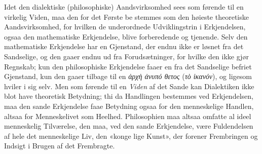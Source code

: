 \documentclass[12pt,a4paper]{book}
\newcommand{\gk}[1]{\textit{#1}}
\begin{document}
Idet den dialektiske (philosophiske) Aandsvirksomhed sees
som førende til en virkelig Viden, maa den for det Første be\-%
stemmes som den høieste theoretiske Aandsvirksomhed, for
hvilken de underordnede Udviklingstrin i Erkjendelsen, ogsaa
den mathematiske Erkjendelse, blive forberedende og tjenende.
Selv den mathematiske Erkjendelse har en Gjenstand, der
endnu ikke er løsnet fra det Sandselige, og den gaaer endnu
ud fra Forudsætninger, for hvilke den ikke gjør Regnskab;
kun den philosophiske Erkjendelse faaer en fra det Sandselige
befriet Gjenstand, kun den gaaer tilbage til en \gk{ἀρχὴ ἀνυπό\-%
θετος} (\gk{τὸ ἱκανόν}), og ligesom hviler i sig selv. Men som
førende til en \emph{Viden} af det Sande kan Dialektiken ikke blot
have theoretisk Betydning; thi da Handlingen bestemmes
ved Erkjendelsen, maa den sande Erkjendelse faae Betydning
ogsaa for den menneskelige Handlen, altsaa for Menneskelivet
som Heelhed. Philosophien maa altsaa omfatte al ideel
menneskelig Tilværelse, den maa, ved den sande Erkjendelse,
være Fuldendelsen af hele det menneskelige Liv, den «konge\-%
lige Kunst», der forener Frembringen og Indsigt i Brugen af
det Frembragte.
\end{document}

